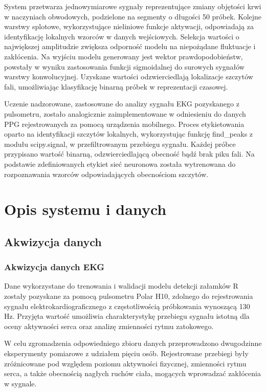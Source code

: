 \documentclass[journal]{IEEEtran}
\begin{document}
System przetwarza jednowymiarowe sygnały reprezentujące zmiany objętości krwi w naczyniach obwodowych, podzielone na segmenty o długości 50 próbek. Kolejne warstwy splotowe, wykorzystujące nieliniowe funkcje aktywacji, odpowiadają za identyfikację lokalnych wzorców w danych wejściowych. Selekcja wartości o największej amplitudzie zwiększa odporność modelu na niepożądane fluktuacje i zakłócenia. Na wyjściu modelu generowany jest wektor prawdopodobieństw, powstały w wyniku zastosowania funkcji sigmoidalnej do surowych sygnałów warstwy konwolucyjnej. Uzyskane wartości odzwierciedlają lokalizacje szczytów fali, umożliwiając klasyfikację binarną próbek w reprezentacji czasowej.


Uczenie nadzorowane, zastosowane do analizy sygnału EKG pozyskanego z pulsometru, zostało analogicznie zaimplementowane w odniesieniu do danych PPG rejestrowanych za pomocą urządzenia mobilnego. Proces etykietowania oparto na identyfikacji szczytów lokalnych, wykorzystując funkcję find\_peaks z modułu scipy.signal, w przefiltrowanym przebiegu sygnału. Każdej próbce przypisano wartość binarną, odzwierciedlającą obecność bądź brak piku fali. Na podstawie zdefiniowanych etykiet sieć neuronowa została wytrenowana do rozpoznawania wzorców odpowiadających obecnościom szczytów.

\newpage
\section{Opis systemu i danych}
\subsection{Akwizycja danych}
\subsubsection{Akwizycja danych EKG}
Dane wykorzystane do trenowania i walidacji modelu detekcji załamków R zostały pozyskane za pomocą pulsometru Polar H10, zdolnego do rejestrowania sygnału elektrokardiograficznego z częstotliwością próbkowania wynoszącą 130 Hz. Przyjęta wartość umożliwia charakterystykę przebiegu sygnału istotną dla oceny aktywności serca oraz analizę zmienności rytmu zatokowego.

W celu zgromadzenia odpowiedniego zbioru danych przeprowadzono dwugodzinne eksperymenty pomiarowe z udziałem pięciu osób. Rejestrowane przebiegi były zróżnicowane pod względem poziomu aktywności fizycznej, zmienności rytmu serca, a także obecnością nagłych ruchów ciała, mogących wprowadzać zakłócenia w sygnale.
\end{document}
